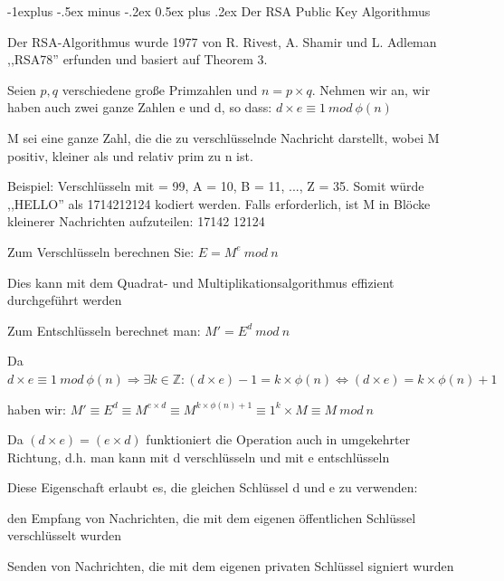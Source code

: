 \documentclass[a4paper]{article}
\makeatletter
\renewcommand{\subsection}{\@startsection{subsection}{2}{0mm}%
 {-1explus -.5ex minus -.2ex}%
 {0.5ex plus .2ex}%
 {\normalfont\normalsize\bfseries}}
\makeatother
\begin{document}
\begin{multicols}{3}
      \subsection{Der RSA Public Key Algorithmus}
      \begin{itemize*}
            \item Der RSA-Algorithmus wurde 1977 von R. Rivest, A. Shamir und L. Adleman ,,RSA78'' erfunden und basiert auf Theorem 3.
            \item Seien $p, q$ verschiedene große Primzahlen und $n=p\times q$. Nehmen wir an, wir haben auch zwei ganze Zahlen e und d, so dass: $d\times e \equiv 1\ mod\ \phi(n)$
            \item M sei eine ganze Zahl, die die zu verschlüsselnde Nachricht darstellt, wobei M positiv, kleiner als und relativ prim zu n ist.
            \item Beispiel: Verschlüsseln mit = 99, A = 10, B = 11, ..., Z = 35. Somit würde ,,HELLO'' als 1714212124 kodiert werden. Falls erforderlich, ist M in Blöcke kleinerer Nachrichten aufzuteilen: 17142 12124
            \item Zum Verschlüsseln berechnen Sie: $E = M^e\ mod\ n$
            \item Dies kann mit dem Quadrat- und Multiplikationsalgorithmus effizient durchgeführt werden
            \item Zum Entschlüsseln berechnet man: $M'=E^d\ mod\ n$
            \begin{itemize*}
                  \item Da $d\times e\equiv 1\ mod\ \phi(n)\Rightarrow\exists k\in\mathbb{Z}:(d\times e)-1=k\times\phi(n)\Leftrightarrow(d\times e)=k\times\phi(n)+1$
                  \item haben wir: $M'\equiv E^d\equiv M^{e\times d}\equiv M^{k\times\phi(n)+1}\equiv 1^k\times M\equiv M\ mod\ n$
            \end{itemize*}
            \item Da $(d\times e)=(e\times d)$ funktioniert die Operation auch in umgekehrter Richtung, d.h. man kann mit d verschlüsseln und mit e entschlüsseln
            \begin{itemize*}
                  \item Diese Eigenschaft erlaubt es, die gleichen Schlüssel d und e zu verwenden:
                  \item den Empfang von Nachrichten, die mit dem eigenen öffentlichen Schlüssel verschlüsselt wurden
                  \item Senden von Nachrichten, die mit dem eigenen privaten Schlüssel signiert wurden

\end{itemize*}
\end{itemize*}
\end{multicols}
\end{document}
